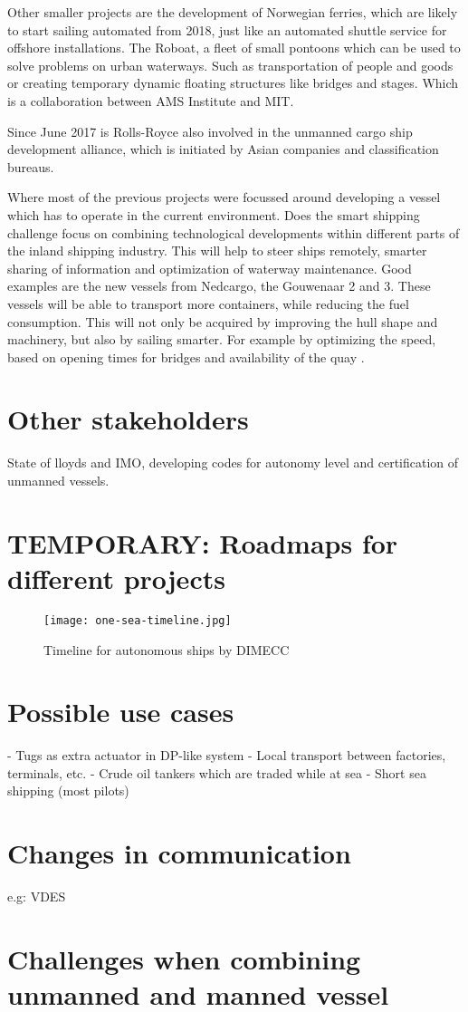 Other smaller projects are the development of Norwegian ferries, which are likely to start sailing automated from 2018, just like an automated shuttle service for offshore installations. The Roboat, a fleet of small pontoons which can be used to solve problems on urban waterways. Such as transportation of people and goods or creating temporary dynamic floating structures like bridges and stages. Which is a collaboration between AMS Institute and MIT.

Since June 2017 is Rolls-Royce also involved in the unmanned cargo ship development alliance, which is initiated by Asian companies and classification bureaus.

Where most of the previous projects were focussed around developing a vessel which has to operate in the current environment. Does the smart shipping challenge focus on combining technological developments within different parts of the inland shipping industry. This will help to steer ships remotely, smarter sharing of information and optimization of waterway maintenance.
Good examples are the new vessels from Nedcargo, the Gouwenaar 2 and 3. These vessels will be able to transport more containers, while reducing the fuel consumption. This will not only be acquired by improving the hull shape and machinery, but also by sailing smarter. For example by optimizing the speed, based on opening times for bridges and availability of the quay \cite{SMASH2017}. 

\section{Other stakeholders}
State of lloyds and IMO, developing codes for autonomy level and certification of unmanned vessels.



\section{TEMPORARY: Roadmaps for different projects}
\begin{figure}[H]
	\centering
	\texttt{[image: one-sea-timeline.jpg]}
	\caption{Timeline for autonomous ships by DIMECC}
	\label{fig:time-line-autonomous}
\end{figure}

\section{Possible use cases}
- Tugs as extra actuator in DP-like system
- Local transport between factories, terminals, etc.
- Crude oil tankers which are traded while at sea
- Short sea shipping (most pilots)

\section{Changes in communication}
e.g: VDES

\section{Challenges when combining unmanned and manned vessel}

